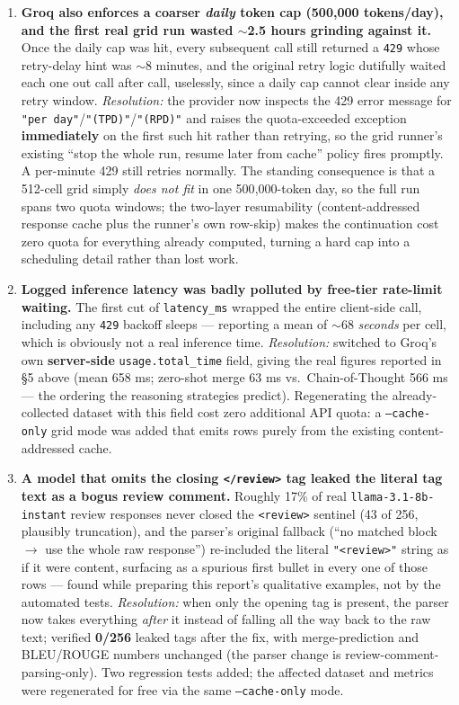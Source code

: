 \documentclass{experimentreport}
\begin{document}
{\begin{enumerate}
\item \textbf{Groq also enforces a coarser \emph{daily} token cap (500{,}000 tokens/day), and the
first real grid run wasted $\sim$2.5 hours grinding against it.} Once the daily cap was hit, every
subsequent call still returned a \texttt{429} whose retry-delay hint was $\sim$8 minutes, and the
original retry logic dutifully waited each one out call after call, uselessly, since a daily cap
cannot clear inside any retry window. \emph{Resolution:} the provider now inspects the 429 error
message for \texttt{"per day"}/\texttt{"(TPD)"}/\texttt{"(RPD)"} and raises the quota-exceeded
exception \textbf{immediately} on the first such hit rather than retrying, so the grid runner's
existing ``stop the whole run, resume later from cache'' policy fires promptly. A per-minute 429
still retries normally. The standing consequence is that a 512-cell grid simply \emph{does not fit}
in one 500{,}000-token day, so the full run spans two quota windows; the two-layer resumability
(content-addressed response cache plus the runner's own row-skip) makes the continuation cost zero
quota for everything already computed, turning a hard cap into a scheduling detail rather than lost
work.

\item \textbf{Logged inference latency was badly polluted by free-tier rate-limit waiting.} The
first cut of \texttt{latency\_ms} wrapped the entire client-side call, including any \texttt{429}
backoff sleeps --- reporting a mean of $\sim$68 \emph{seconds} per cell, which is obviously not a
real inference time. \emph{Resolution:} switched to Groq's own \textbf{server-side}
\texttt{usage.total\_time} field, giving the real figures reported in \S5 above (mean 658 ms;
zero-shot merge 63 ms vs.\ Chain-of-Thought 566 ms --- the ordering the reasoning strategies
predict). Regenerating the already-collected dataset with this field cost zero additional API
quota: a \texttt{--cache-only} grid mode was added that emits rows purely from the existing
content-addressed cache.

\item \textbf{A model that omits the closing \texttt{</review>} tag leaked the literal tag text as
a bogus review comment.} Roughly 17\% of real \texttt{llama-3.1-8b-instant} review responses never
closed the \texttt{<review>} sentinel (43 of 256, plausibly truncation), and the parser's original
fallback (``no matched block $\rightarrow$ use the whole raw response'') re-included the literal
\texttt{"<review>"} string as if it were content, surfacing as a spurious first bullet in every one
of those rows --- found while preparing this report's qualitative examples, not by the automated
tests. \emph{Resolution:} when only the opening tag is present, the parser now takes everything
\emph{after} it instead of falling all the way back to the raw text; verified \textbf{0/256} leaked
tags after the fix, with merge-prediction and BLEU/ROUGE numbers unchanged (the parser change is
review-comment-parsing-only). Two regression tests added; the affected dataset and metrics were
regenerated for free via the same \texttt{--cache-only} mode.


\end{enumerate}}
\end{document}
